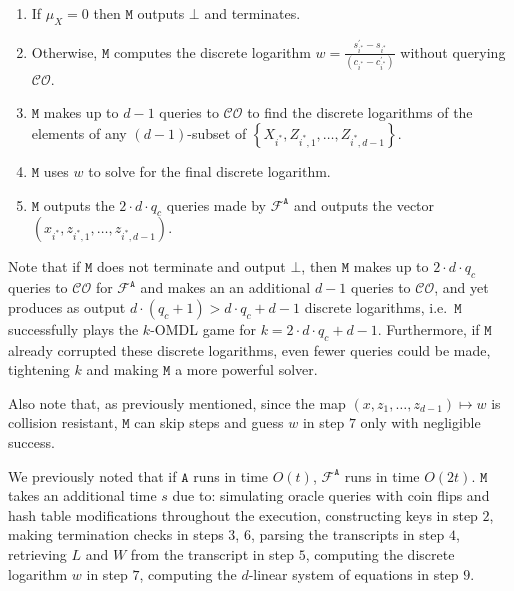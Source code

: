 \documentclass{article}
\theoremstyle{plain}
\theoremstyle{definition}
\begin{document}
\begin{enumerate}
\item If $\mu_X = 0$ then $\texttt{M}$ outputs $\bot$ and terminates.

\item Otherwise, $\texttt{M}$ computes the discrete logarithm
$w = \frac{s_{i^*}^\prime - s_{i^*}}{(c_{i^*} - c_{i^*}^\prime)}$ without querying $\mathcal{CO}$.

\item $\texttt{M}$ makes up to $d-1$ queries to $\mathcal{CO}$ to find the discrete logarithms of the elements of any $(d-1)$-subset of $\left\{X_{i^*}, Z_{i^*, 1}, \ldots, Z_{i^*, d-1}\right\}$.

\item $\texttt{M}$ uses $w$ to solve for the final discrete logarithm. 

\item $\texttt{M}$ outputs the $2 \cdot d \cdot q_c$ queries made by $\mathcal{F}^{\texttt{A}}$ and outputs the vector $(x_{i^*}, z_{i^*, 1}, \ldots, z_{i^*, d-1})$.

\end{enumerate}

Note that if $\texttt{M}$ does not terminate and output $\bot$, then $\texttt{M}$ makes up to $2\cdot d \cdot q_c$ queries to $\mathcal{CO}$ for $\mathcal{F}^{\texttt{A}}$ and makes an an additional $d-1$ queries to $\mathcal{CO}$, and yet produces as output $d \cdot (q_c + 1) > d \cdot q_c + d-1$ discrete logarithms, i.e.\ $\texttt{M}$ successfully plays the $k$-OMDL game for $k = 2\cdot d\cdot q_c + d-1$. Furthermore,  if $\texttt{M}$ already corrupted these discrete logarithms, even fewer queries could be made, tightening $k$ and making $\texttt{M}$ a more powerful solver. 

Also note that, as previously mentioned, since the map $(x, z_1, \ldots, z_{d-1}) \mapsto w$ is collision resistant, $\texttt{M}$ can skip steps and guess $w$ in step $7$ only with negligible success.

We previously noted that if $\texttt{A}$ runs in time $O(t)$, $\mathcal{F}^{\texttt{A}}$ runs in time $O(2t)$. $\texttt{M}$ takes an additional  time $s$ due to: simulating oracle queries with coin flips and hash table modifications throughout the execution, constructing keys in step $2$,  making termination checks in steps $3$, $6$, parsing the transcripts in step $4$, retrieving $L$ and $W$ from the transcript in step $5$, computing the discrete logarithm $w$ in step $7$, computing the $d$-linear system of equations in step $9$.
\end{document}
